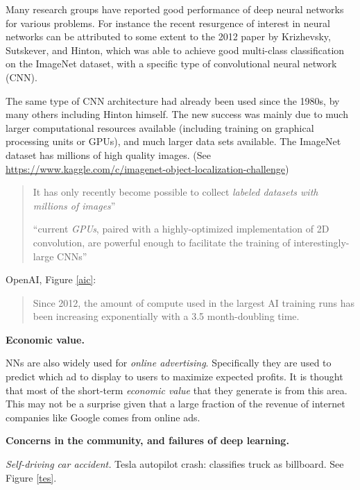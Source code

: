 \documentclass[english]{article}
\begin{document}
Many research groups have reported good performance of deep neural networks for various problems. For instance the recent resurgence of interest in neural networks can be attributed to some extent to the 2012 paper by Krizhevsky, Sutskever, and Hinton, which  was able to achieve  good multi-class classification on the ImageNet dataset, with a specific type of convolutional neural network (CNN). 

The same type of CNN architecture had already been used since the 1980s, by many others including Hinton himself. The new success was mainly due to much larger  computational  resources available (including training on graphical processing units or GPUs), and much larger data sets available. The ImageNet dataset has millions of high quality  images. (See \url{https://www.kaggle.com/c/imagenet-object-localization-challenge})

\begin{quote}

It has only recently become possible to collect
\emph{labeled datasets with millions of images}''

``current \emph{GPUs}, paired with a highly-optimized implementation of 2D convolution, are powerful
enough to facilitate the training of interestingly-large CNNs''
\end{quote}

OpenAI, Figure \ref{aic}: 
\begin{quote}
Since 2012, the amount of compute used in the largest AI training runs has been increasing exponentially with a 3.5 month-doubling time.
\end{quote}

\item {\bf Economic value.}

NNs are also widely used for  \emph{online advertising}.  Specifically they are used to  predict  which ad to display to users to maximize  expected profits. It is thought that  most of the short-term \emph{economic value} that they generate  is from this area. This may not be a surprise given  that a large fraction of the revenue of internet companies like Google comes from online ads. 



\item {\bf Concerns in the community, and failures of deep learning.}

\benum 
\item
\emph{Self-driving car accident.}  Tesla autopilot crash: classifies truck as billboard. See Figure \ref{tes}.
\end{document}
